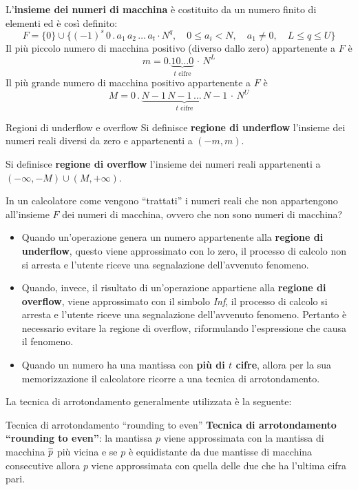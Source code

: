 L'\textbf{insieme dei numeri di macchina} è costituito da un numero finito di elementi ed è così definito:
\[F=\{0\}\cup\{(-1)^{s}\,0\,.\,a_1\,a_2\,\dots\,a_t\cdot N^q,\quad 0\leq a_i<N,\quad a_1\ne0,\quad
L\leq q\leq U\}\]
Il più piccolo numero di macchina positivo (diverso dallo zero) appartenente a $F$ è
\[m=0.\underbrace{10\dots0}_{t\text{ cifre}}\,\cdot\,N^L\]
Il più grande numero di macchina positivo appartenente a $F$ è
\[M=0\,.\,\underbrace{N-1\,N-1\,\dots\,N-1}_{t\text{ cifre}}\,\cdot\,N^U\]
\begin{definition}{Regioni di underflow e overflow}
    Si definisce \textbf{regione di underflow} l'insieme dei numeri reali diversi da zero e
    appartenenti a $(-m,m)$.

    Si definisce \textbf{regione di overflow} l'insieme dei numeri reali appartenenti a
    $(-\infty,-M)\cup(M,+\infty)$.
\end{definition}

In un calcolatore come vengono ``trattati'' i numeri reali che non appartengono all'insieme $F$ dei
numeri di macchina, ovvero che non sono numeri di macchina?
\begin{itemize}
    \item Quando un'operazione genera un numero appartenente alla \textbf{regione di underflow},
    questo viene approssimato con lo zero, il processo di calcolo non si arresta e l'utente riceve
    una segnalazione dell'avvenuto fenomeno.
    \item Quando, invece, il risultato di un'operazione appartiene alla \textbf{regione di overflow},
    viene approssimato con il simbolo \textit{Inf}, il processo di calcolo si arresta e l'utente
    riceve una segnalazione dell'avvenuto fenomeno. Pertanto è necessario evitare la regione di
    overflow, riformulando l'espressione che causa il fenomeno.
    \item Quando un numero ha una mantissa con \textbf{più di $t$ cifre}, allora per la sua memorizzazione il
    calcolatore ricorre a una tecnica di arrotondamento.
\end{itemize}

La tecnica di arrotondamento generalmente utilizzata è la seguente:
\begin{definition}{Tecnica di arrotondamento ``rounding to even''}
    \textbf{Tecnica di arrotondamento ``rounding to even''}: la mantissa $p$ viene approssimata con
    la mantissa di macchina $\overline{p\vphantom{\rule{0pt}{1.2ex}}}$ più vicina e se $p$ è
    equidistante da due mantisse di macchina consecutive allora $p$ viene approssimata con quella
    delle due che ha l'ultima cifra pari.
\end{definition}

